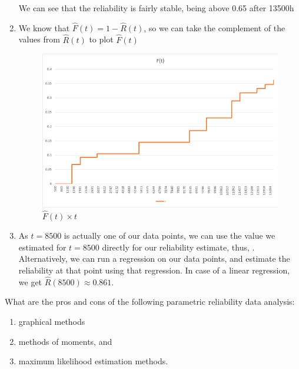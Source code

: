 \documentclass{article}
\begin{document}
\begin{enumerate}[label=(\alph*)]
    We can see that the reliability is fairly stable, being above 0.65 after 13500h
    \item We know that $\hat{F}(t) = 1 - \hat{R}(t)$, so we can take the complement of the values from $\hat{R}(t)$ to plot $\hat{F}(t)$

    \begin{figure}[H]
        \centering
        \includegraphics[width=0.8\linewidth]{q3_ft.png}
        \caption{$\hat{F}(t) \times t$}
        \label{fig:q3_km_ft}
    \end{figure}

    \item As $t=8500$ is actually one of our data points, we can use the value we estimated for $t=8500$ directly for our reliability estimate, thus, . Alternatively, we can run a regression on our data points, and estimate the reliability at that point using that regression. In case of a linear regression, we get $\hat{R}(8500) \approx 0.861$.
\end{enumerate}


\setcounter{Question}{6}
\begin{question}
    What are the pros and cons of the following parametric reliability data analysis:
    \begin{enumerate}[label=(\alph*)]
        \item graphical methods

        \item methods of moments, and
        \item  maximum likelihood estimation methods.
    \end{enumerate}
\end{question}
\end{document}
